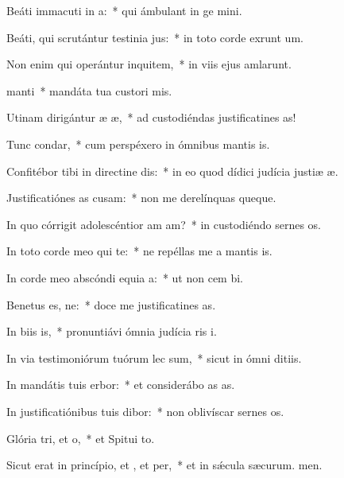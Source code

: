 \item Beáti immacuti in a:~* qui ámbulant in ge mini.
\item Beáti, qui scrutántur testinia jus:~* in toto corde exrunt um.
\item Non enim qui operántur inquitem,~* in viis ejus amlarunt.
\item {} manti~* mandáta tua custori mis.
\item Utinam dirigántur æ æ,~* ad custodiéndas justificatines as!
\item Tunc  condar,~* cum perspéxero in ómnibus mantis is.
\item Confitébor tibi in directine dis:~* in eo quod dídici judícia justiæ æ.
\item Justificatiónes as cusam:~* non me derelínquas queque.
\item In quo córrigit adolescéntior am am?~* in custodiéndo sernes os.
\item In toto corde meo qui te:~* ne repéllas me a mantis is.
\item In corde meo abscóndi equia a:~* ut non cem bi.
\item Benetus es, ne:~* doce me justificatines as.
\item In biis is,~* pronuntiávi ómnia judícia ris i.
\item In via testimoniórum tuórum lec sum,~* sicut in ómni ditiis.
\item In mandátis tuis erbor:~* et considerábo as as.
\item In justificatiónibus tuis dibor:~* non oblivíscar sernes os.
\item Glória tri, et o,~* et Spitui to.
\item Sicut erat in princípio, et , et per,~* et in sǽcula sæcurum. men.
